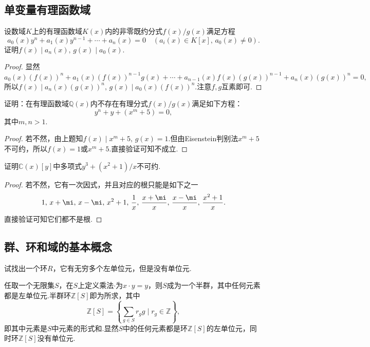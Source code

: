 \subsection{单变量有理函数域}
\begin{prob}[1]
	设数域$K$上的有理函数域$K(x)$内的非零既约分式$f(x)/g(x)$满足方程
	\[
		a_0(x)y^n+a_1(x)y^{n-1}+\cdots+a_n(x)=0\quad(a_i(x)\in K[x],\,a_0(x)\ne 0).
	\]
	证明$f(x)\mid a_n(x),\,g(x)\mid a_0(x)$.
\end{prob}
\begin{proof}
	显然
	\[
		a_0(x)(f(x))^n+a_1(x)(f(x))^{n-1}g(x)+\cdots+a_{n-1}(x)f(x)(g(x))^{n-1}+a_n(x)(g(x))^n=0,
	\]
	所以$f(x)\mid a_n(x)(g(x))^n,\,g(x)\mid a_0(x)(f(x))^n$.注意$f,g$互素即可.
\end{proof}
\begin{prob}[3]
	证明：在有理函数域$\mathbb{Q}(x)$内不存在有理分式$f(x)/g(x)$满足如下方程：
	\[
		y^n+y+(x^m+5)=0,
	\]
	其中$m,n>1$.
\end{prob}
\begin{proof}
	若不然，由上题知$f(x)\mid x^m+5,\,g(x)=1$.但由Eisenstein判别法$x^m+5$不可约，所以$f(x)=1$或$x^m+5$.直接验证可知不成立.
\end{proof}
\begin{prob}[4]
	证明$\mathbb{C}(x)[y]$中多项式$y^3+(x^2+1)/x$不可约.
\end{prob}
\begin{proof}
	若不然，它有一次因式，并且对应的根只能是如下之一
	\[
		1,\,x+\mi,\,x-\mi,\,x^2+1,\,\frac{1}{x},\,\frac{x+\mi}{x},\,\frac{x-\mi}{x},\,\frac{x^2+1}{x}.
	\]
	直接验证可知它们都不是根.
\end{proof}
\newpage
\subsection{群、环和域的基本概念}
\begin{prob}[12]
	试找出一个环$R$，它有无穷多个左单位元，但是没有单位元.
\end{prob}
\begin{sol}
	任取一个无限集$S$，在$S$上定义乘法$\cdot$为$x\cdot y=y$，则$S$成为一个半群，其中任何元素都是左单位元.半群环$\mathbb{Z}[S]$即为所求，其中
	\[
		\mathbb{Z}[S]=\left\{\sum_{g\in S}r_gg\mid r_g\in\mathbb{Z}\right\},
	\]
	即其中元素是$S$中元素的形式和.显然$S$中的任何元素都是环$\mathbb{Z}[S]$的左单位元，同时环$\mathbb{Z}[S]$没有单位元.
\end{sol}